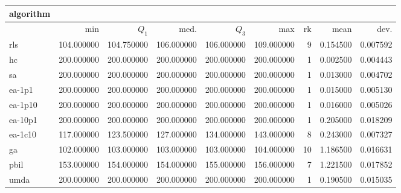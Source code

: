 \begin{tabular}{@{}l*{5}{>{{}}N{3}{0}}>{{}}N{2}{0}N{1}{3}N{1}{3}@{}}
\toprule
{algorithm} &  &  \\
\midrule
& {min} & {$Q_1$} & {med.} & {$Q_3$} & {max} & {rk} & {mean} & {dev.} \\
\midrule
rls & 104.000000 & 104.750000 & 106.000000 & 106.000000 & 109.000000 & 9 & 0.154500 & 0.007592 \\
 hc & {\color{blue}} 200.000000 & {\color{blue}} 200.000000 & {\color{blue}} 200.000000 & {\color{blue}} 200.000000 & {\color{blue}} 200.000000 & 1 & 0.002500 & 0.004443 \\
 sa & {\color{blue}} 200.000000 & {\color{blue}} 200.000000 & {\color{blue}} 200.000000 & {\color{blue}} 200.000000 & {\color{blue}} 200.000000 & 1 & 0.013000 & 0.004702 \\
 ea-1p1 & {\color{blue}} 200.000000 & {\color{blue}} 200.000000 & {\color{blue}} 200.000000 & {\color{blue}} 200.000000 & {\color{blue}} 200.000000 & 1 & 0.015000 & 0.005130 \\
 ea-1p10 & {\color{blue}} 200.000000 & {\color{blue}} 200.000000 & {\color{blue}} 200.000000 & {\color{blue}} 200.000000 & {\color{blue}} 200.000000 & 1 & 0.016000 & 0.005026 \\
 ea-10p1 & {\color{blue}} 200.000000 & {\color{blue}} 200.000000 & {\color{blue}} 200.000000 & {\color{blue}} 200.000000 & {\color{blue}} 200.000000 & 1 & 0.205000 & 0.018209 \\
 ea-1c10 & 117.000000 & 123.500000 & 127.000000 & 134.000000 & 143.000000 & 8 & 0.243000 & 0.007327 \\
 ga & 102.000000 & 103.000000 & 103.000000 & 103.000000 & 104.000000 & 10 & 1.186500 & 0.016631 \\
 pbil & 153.000000 & 154.000000 & 154.000000 & 155.000000 & 156.000000 & 7 & 1.221500 & 0.017852 \\
 umda & {\color{blue}} 200.000000 & {\color{blue}} 200.000000 & {\color{blue}} 200.000000 & {\color{blue}} 200.000000 & {\color{blue}} 200.000000 & 1 & 0.190500 & 0.015035 \\
 \bottomrule
\end{tabular}
